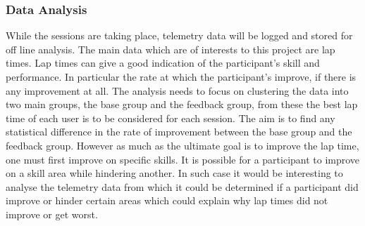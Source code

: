 \subsubsection{Data Analysis}

	While the sessions are taking place, telemetry data will be logged and stored for off line analysis. The main data which are of interests to this project are lap times. Lap times can give a good indication of the participant's skill and performance. In particular the rate at which the participant's improve, if there is any improvement at all. The analysis needs to focus on clustering the data into two main groups, the base group and the feedback group, from these the best lap time of each user is to be considered for each session. The aim is to find any statistical difference in the rate of improvement between the base group and the feedback group. However as much as the ultimate goal is to improve the lap time, one must first improve on specific skills. It is possible for a participant to improve on a skill area while hindering another. In such case it would be interesting to analyse the telemetry data from which it could be determined if a participant did improve or hinder certain areas which could explain why lap times did not improve or get worst.
